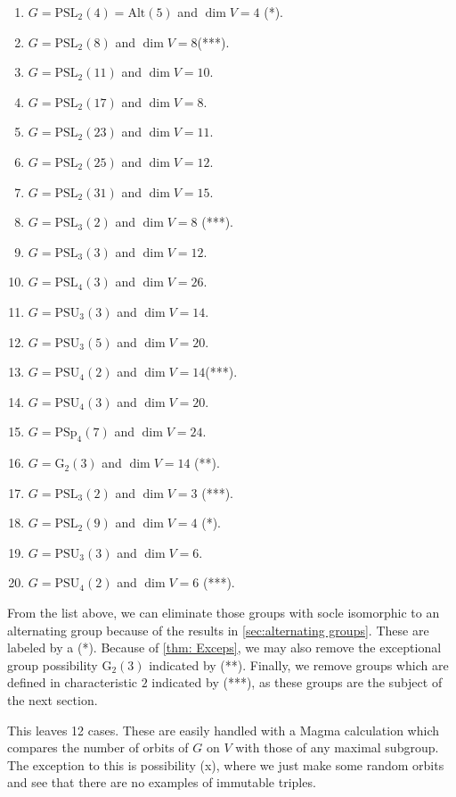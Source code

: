\documentclass[12pt]{amsart}
\theoremstyle{remark}
\theoremstyle{notation}
\theoremstyle{definition}
\newcommand{\G}{\mathrm{G}}
\newcommand{\PSU}{\mathrm{PSU}}
\newcommand{\0}{\emptyset}
\newcommand{\PSL}{\mathrm{PSL}}
\newcommand{\PSp}{\mathrm{PSp}}
\newcommand{\Alt}{\mathrm{Alt}}
\begin{document}
\begin{enumerate}
\item $G=\PSL_2(4)=\Alt(5)$ and $\dim V=4$ (*).
\item $G=\PSL_2(8) $ and $\dim V = 8$(***).
\item $G=\PSL_2(11)$ and $\dim V=10$.
\item $G=\PSL_2(17)$ and $\dim V= 8$.
\item $G= \PSL_2(23)$ and $\dim V= 11$.
\item $G=\PSL_2(25)$ and $\dim V= 12$.
\item $G=\PSL_2(31)$ and $\dim V= 15$.
\item $G=\PSL_3(2)$ and $\dim V=8$ (***).
\item $G=\PSL_3(3)$ and $\dim V= 12$.
\item $G=\PSL_4(3)$ and $\dim V = 26$.
\item $G=\PSU_3(3) $ and $\dim V= 14$.
\item $G=\PSU_3(5)$ and $\dim V= 20$.
\item $G=\PSU_4(2)$ and $\dim V= 14$(***).
\item $G=\PSU_4(3)$ and $\dim V= 20$.
\item $G= \PSp_4(7)$ and $\dim V= 24$.
\item $G=\G_2(3) $ and $\dim V=14$ (**).
\item $G=\PSL_3(2)$ and $\dim V=3$ (***).
\item $G=\PSL_2(9)$ and $\dim V= 4$ (*).
\item $G=\PSU_3(3)$ and $\dim V=6$.
\item $G=\PSU_4(2) $ and $\dim V= 6$ (***).
\end{enumerate}

From the list above, we can eliminate those groups with socle isomorphic to an alternating group because of the results in \cref{sec:alternating groups}. These are labeled by a (*). Because of \cref{thm: Exceps}, we may also remove the exceptional group possibility  $\G_2(3)$ indicated by (**).
Finally, we remove groups which are defined in characteristic $2$ indicated by (***), as these groups are the subject of the next section.

This leaves 12 cases. These are easily handled with a {\sc Magma} calculation which compares the number of orbits of $G$ on $V$ with those of any maximal subgroup. The exception to this is  possibility (x), where we just make some random orbits and see that there are no examples of immutable triples.
\end{document}
